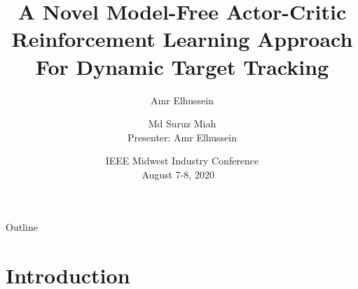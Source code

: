 \documentclass{beamer}
\title[A Novel Model-Free Actor-Critic Reinforcement Learning Approach For Dynamic Target Tracking]{A Novel Model-Free Actor-Critic Reinforcement Learning Approach For Dynamic Target Tracking}
\author[A.Elhussein,~and~S.~Miah]{Amr Elhussein \and Md Suruz Miah\\ Presenter: Amr Elhussein}
\institute[shortinst] %
{
    Electrical and Computer Engineering, Bradley University, Peoria, IL, USA
}
\date[MIC~2020]
{{\footnotesize IEEE Midwest Industry Conference
\\
August 7-8, 2020 ~}
}
\begin{document}
\begin{frame}
  \titlepage
\end{frame}

\begin{frame}{Outline}
  \tableofcontents
\end{frame}

\section{Introduction}

\end{document}
